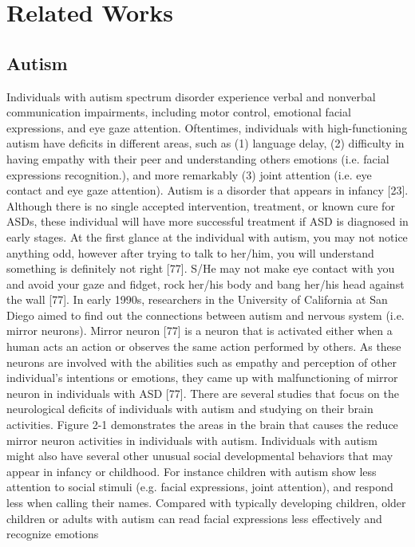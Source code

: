 \chapter{Related Works}

\section{Autism}
Individuals with autism spectrum disorder experience verbal and nonverbal
communication impairments, including motor control, emotional facial expressions, and
eye gaze attention. Oftentimes, individuals with high-functioning autism have deficits in
different areas, such as (1) language delay, (2) difficulty in having empathy with their peer
and understanding others emotions (i.e. facial expressions recognition.), and more
remarkably (3) joint attention (i.e. eye contact and eye gaze attention). Autism is a disorder
that appears in infancy [23]. Although there is no single accepted intervention, treatment,
or known cure for ASDs, these individual will have more successful treatment if ASD is
diagnosed in early stages. At the first glance at the individual with autism, you may not
notice anything odd, however after trying to talk to her/him, you will understand something
is definitely not right [77]. S/He may not make eye contact with you and avoid your gaze
and fidget, rock her/his body and bang her/his head against the wall [77].
In early 1990s, researchers in the University of California at San Diego aimed to
find out the connections between autism and nervous system (i.e. mirror neurons). Mirror
neuron [77] is a neuron that is activated either when a human acts an action or observes the
same action performed by others. As these neurons are involved with the abilities such as
empathy and perception of other individual’s intentions or emotions, they came up with malfunctioning of mirror neuron in individuals with ASD [77]. There are several studies
that focus on the neurological deficits of individuals with autism and studying on their
brain activities. Figure 2-1 demonstrates the areas in the brain that causes the reduce mirror
neuron activities in individuals with autism.
Individuals with autism might also have several other unusual social developmental
behaviors that may appear in infancy or childhood. For instance children with autism show
less attention to social stimuli (e.g. facial expressions, joint attention), and respond less
when calling their names. Compared with typically developing children, older children or
adults with autism can read facial expressions less effectively and recognize emotions
